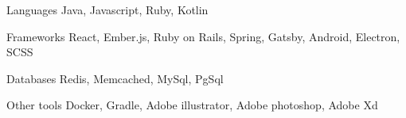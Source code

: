 
\begin{cvskills}
  \cvskill
    {Languages} %
    {Java, Javascript, Ruby, Kotlin} %

  \cvskill
    {Frameworks} %
    {React, Ember.js, Ruby on Rails, Spring, Gatsby, Android, Electron, SCSS} %

  \cvskill
    {Databases} %
    {Redis, Memcached, MySql, PgSql} %

  \cvskill
    {Other tools} %
    {Docker, Gradle, Adobe illustrator, Adobe photoshop, Adobe Xd} %
  
\end{cvskills}